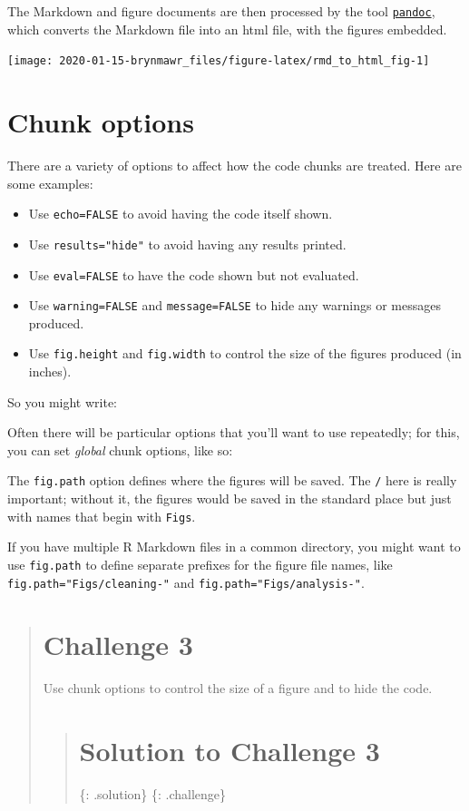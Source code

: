 \documentclass[]{book}
\providecommand{\tightlist}{%
  \setlength{\itemsep}{0pt}\setlength{\parskip}{0pt}}
\begin{document}
The Markdown and figure documents are then processed by the tool
\href{http://pandoc.org/}{\texttt{pandoc}}, which converts the Markdown
file into an html file, with the figures embedded.

\begin{flushleft}\texttt{[image: 2020-01-15-brynmawr\_files/figure-latex/rmd\_to\_html\_fig-1]} \end{flushleft}

\section{Chunk options}\label{chunk-options}

There are a variety of options to affect how the code chunks are
treated. Here are some examples:

\begin{itemize}
\tightlist
\item
  Use \texttt{echo=FALSE} to avoid having the code itself shown.
\item
  Use \texttt{results="hide"} to avoid having any results printed.
\item
  Use \texttt{eval=FALSE} to have the code shown but not evaluated.
\item
  Use \texttt{warning=FALSE} and \texttt{message=FALSE} to hide any
  warnings or messages produced.
\item
  Use \texttt{fig.height} and \texttt{fig.width} to control the size of
  the figures produced (in inches).
\end{itemize}

So you might write:

Often there will be particular options that you'll want to use
repeatedly; for this, you can set \emph{global} chunk options, like so:

The \texttt{fig.path} option defines where the figures will be saved.
The \texttt{/} here is really important; without it, the figures would
be saved in the standard place but just with names that begin with
\texttt{Figs}.

If you have multiple R Markdown files in a common directory, you might
want to use \texttt{fig.path} to define separate prefixes for the figure
file names, like \texttt{fig.path="Figs/cleaning-"} and
\texttt{fig.path="Figs/analysis-"}.

\begin{quote}
\section{Challenge 3}\label{challenge-3-1}

Use chunk options to control the size of a figure and to hide the code.

\begin{quote}
\section{Solution to Challenge 3}\label{solution-to-challenge-3}

\{: .solution\} \{: .challenge\}
\end{quote}
\end{quote}
\end{document}
